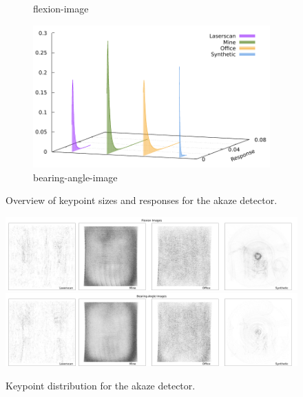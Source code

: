 \begin{figure}[H]
\begin{subfigure}[t]{0.45\linewidth}
    \caption{\gls{flexion-image}}
\end{subfigure}\quad
\begin{subfigure}[t]{0.45\linewidth}
    \includegraphics[width=\linewidth]{chapter06/results/AKAZE/bearing/response.pdf}
    \caption{\gls{bearing-angle-image}}
\end{subfigure}
    \caption{Overview of keypoint sizes and responses for the \acrshort{akaze} detector.}
\end{figure}
\begin{figure}[H]
    \includegraphics[width=\linewidth]{chapter06/results/AKAZE/flexion/distribution.pdf}\\
    \includegraphics[width=\linewidth]{chapter06/results/AKAZE/bearing/distribution.pdf}%
    \caption{Keypoint distribution for the \acrshort{akaze} detector.}
\end{figure}
